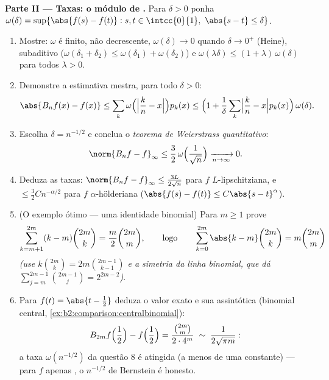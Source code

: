 \begin{problem}
\medskip
\noindent\textbf{Parte II --- Taxas: o módulo de .}
Para $\delta > 0$ ponha $\omega(\delta) = \sup\{\abs{f(s) - f(t)}
: s, t \in \intcc{0}{1},\ \abs{s - t} \leq \delta\}$.
\begin{enumerate}[resume]
  \item Mostre: $\omega$ é finito, não decrescente,
        $\omega(\delta) \to 0$ quando $\delta \to 0^+$ (Heine),
        subaditivo ($\omega(\delta_1 + \delta_2) \leq
        \omega(\delta_1) + \omega(\delta_2)$) e
        $\omega(\lambda\delta) \leq (1 +
        \lambda)\,\omega(\delta)$ para todos $\lambda > 0$.
  \item Demonstre a estimativa mestra, para todo $\delta > 0$:
        \[
        \abs{B_nf(x) - f(x)}
        \leq \sum_k \omega\Bigl(\Bigl|\frac kn -
        x\Bigr|\Bigr)p_k(x)
        \leq \Bigl(1 + \frac1\delta\sum_k\Bigl|\frac kn -
        x\Bigr|p_k(x)\Bigr)\,\omega(\delta) .
        \]
  \item Escolha $\delta = n^{-1/2}$ e conclua o
        \emph{teorema de Weierstrass quantitativo}:
        \[
        \norm{B_nf - f}_\infty \leq
        \frac32\,\omega\Bigl(\frac{1}{\sqrt n}\Bigr)
        \xrightarrow[n\to\infty]{} 0 .
        \]
  \item Deduza as taxas: $\norm{B_nf - f}_\infty \leq
        \frac{3L}{2\sqrt n}$ para $f$ $L$-lipschitziana, e $\leq
        \frac32 C n^{-\alpha/2}$ para $f$ $\alpha$-hölderiana
        ($\abs{f(s) - f(t)} \leq C\abs{s-t}^\alpha$).
  \item (O exemplo ótimo --- uma identidade binomial) Para $m
        \geq 1$ prove
        \[
        \sum_{k=m+1}^{2m} (k - m)\binom{2m}{k}
        = \frac{m}{2}\binom{2m}{m},
        \qquad\text{logo}\qquad
        \sum_{k=0}^{2m}\abs{k - m}\binom{2m}{k}
        = m\binom{2m}{m}
        \]
        \emph{(use $k\binom{2m}k = 2m\binom{2m-1}{k-1}$ e a
        simetria da linha binomial, que dá
        $\sum_{j=m}^{2m-1}\binom{2m-1}{j} = 2^{2m-2}$)}.
  \item Para $f(t) = \abs{t - \frac12}$ deduza o valor exato
        e sua assintótica (binomial central,
        \cref{ex:b2:comparison:centralbinomial}):
        \[
        B_{2m}f\Bigl(\frac12\Bigr) - f\Bigl(\frac12\Bigr)
        = \frac{\binom{2m}{m}}{2\cdot4^{m}}
        \;\sim\; \frac{1}{2\sqrt{\pi m}} :
        \]
        a taxa $\omega(n^{-1/2})$ da questão 8 é atingida
        (a menos de uma constante) --- para $f$ apenas ,
        o $n^{-1/2}$ de Bernstein é honesto.
\end{enumerate}


\end{problem}
